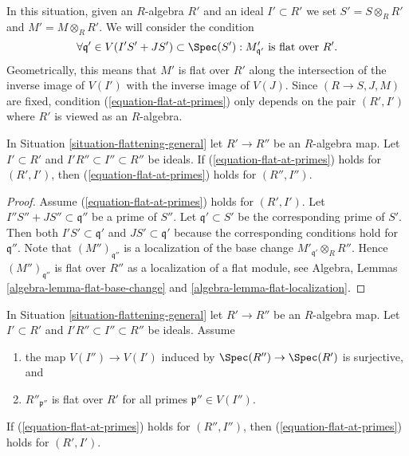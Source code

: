 \noindent
In this situation, given an $R$-algebra $R'$ and an ideal $I' \subset R'$
we set $S' = S \otimes_R R'$ and $M' = M \otimes_R R'$.
We will consider the condition
\begin{equation}
\label{equation-flat-at-primes}
\forall \mathfrak q' \in V(I'S' + JS') \subset \Spec(S') :
M'_{\mathfrak q'}\text{ is flat over }R'.
\end{equation}
Geometrically, this means that $M'$ is flat over $R'$ along the intersection
of the inverse image of $V(I')$ with the inverse image of $V(J)$.
Since $(R \to S, J, M)$ are fixed, condition (\ref{equation-flat-at-primes})
only depends on the pair $(R', I')$ where $R'$ is viewed as an $R$-algebra.

\begin{lemma}
\label{lemma-base-change-flat-at-primes}
In Situation \ref{situation-flattening-general}
let $R' \to R''$ be an $R$-algebra map.
Let $I' \subset R'$ and $I'R'' \subset I'' \subset R''$ be ideals.
If (\ref{equation-flat-at-primes}) holds for
$(R', I')$, then (\ref{equation-flat-at-primes})
holds for $(R'', I'')$.
\end{lemma}

\begin{proof}
Assume (\ref{equation-flat-at-primes}) holds for $(R', I')$.
Let $I''S'' + JS'' \subset \mathfrak q''$ be a prime of $S''$.
Let $\mathfrak q' \subset S'$ be the corresponding prime of $S'$.
Then both $I'S' \subset \mathfrak q'$ and $JS' \subset \mathfrak q'$
because the corresponding conditions hold for $\mathfrak q''$.
Note that $(M'')_{\mathfrak q''}$
is a localization of the base change $M'_{\mathfrak q'} \otimes_R R''$.
Hence $(M'')_{\mathfrak q''}$ is flat over $R''$ as a localization
of a flat module, see
Algebra, Lemmas \ref{algebra-lemma-flat-base-change} and
\ref{algebra-lemma-flat-localization}.
\end{proof}

\begin{lemma}
\label{lemma-flat-descent-flat-at-primes}
In Situation \ref{situation-flattening-general}
let $R' \to R''$ be an $R$-algebra map.
Let $I' \subset R'$ and $I'R'' \subset I'' \subset R''$ be ideals.
Assume
\begin{enumerate}
\item the map $V(I'') \to V(I')$ induced by
$\Spec(R'') \to \Spec(R')$ is surjective, and
\item $R''_{\mathfrak p''}$ is flat over $R'$ for all primes
$\mathfrak p'' \in V(I'')$.
\end{enumerate}
If (\ref{equation-flat-at-primes}) holds for
$(R'', I'')$, then (\ref{equation-flat-at-primes}) holds for $(R', I')$.
\end{lemma}

